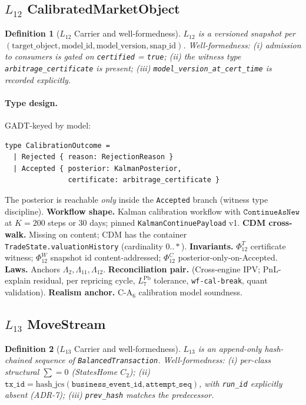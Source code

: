 \documentclass[11pt,a4paper]{article}
\newtheorem{definition}{Definition}[section]
\begin{document}
\subsection{$L_{12}$ CalibratedMarketObject}
\label{sec:leaf-l12}

\begin{definition}[$L_{12}$ Carrier and well-formedness]
$L_{12}$ is a versioned snapshot per $(\text{target\_object}, \text{model\_id}, \text{model\_version}, \text{snap\_id})$. Well-formedness: (i) admission to consumers is gated on \texttt{certified} = \texttt{true}; (ii) the witness type \texttt{arbitrage\_certificate} is present; (iii) \texttt{model\_version\_at\_cert\_time} is recorded explicitly.
\end{definition}

\paragraph{Type design.} GADT-keyed by model:
\begin{lstlisting}
type CalibrationOutcome =
  | Rejected { reason: RejectionReason }
  | Accepted { posterior: KalmanPosterior,
               certificate: arbitrage_certificate }
\end{lstlisting}
The posterior is reachable \emph{only} inside the \texttt{Accepted} branch (witness type discipline). \textbf{Workflow shape.} Kalman calibration workflow with $\texttt{ContinueAsNew}$ at $K = 200$ steps or 30 days; pinned \texttt{KalmanContinuePayload} v1. \textbf{CDM cross-walk.} Missing on content; CDM has the container \texttt{TradeState.valuationHistory} (cardinality $0..*$). \textbf{Invariants.} $\Phi_{12}^T$ certificate witness; $\Phi_{12}^W$ snapshot id content-addressed; $\Phi_{12}^C$ posterior-only-on-Accepted. \textbf{Laws.} Anchors $\Lambda_2, \Lambda_{11}, \Lambda_{12}$. \textbf{Reconciliation pair.} (Cross-engine IPV; PnL-explain residual, per repricing cycle, $L_7^{\mathrm{Pb}}$ tolerance, \texttt{wf-cal-break}, quant validation). \textbf{Realism anchor.} $\mathrm{C\textrm{-}A}_6$ calibration model soundness.

\subsection{$L_{13}$ MoveStream}
\label{sec:leaf-l13}

\begin{definition}[$L_{13}$ Carrier and well-formedness]
$L_{13}$ is an append-only hash-chained sequence of \texttt{BalancedTransaction}. Well-formedness: (i) per-class structural $\sum=0$ (StatesHome $C_2$); (ii) $\texttt{tx\_id} = \mathrm{hash\_jcs}(\texttt{business\_event\_id}, \texttt{attempt\_seq})$, with \texttt{run\_id} explicitly absent (ADR-7); (iii) \texttt{prev\_hash} matches the predecessor.
\end{definition}
\end{document}
